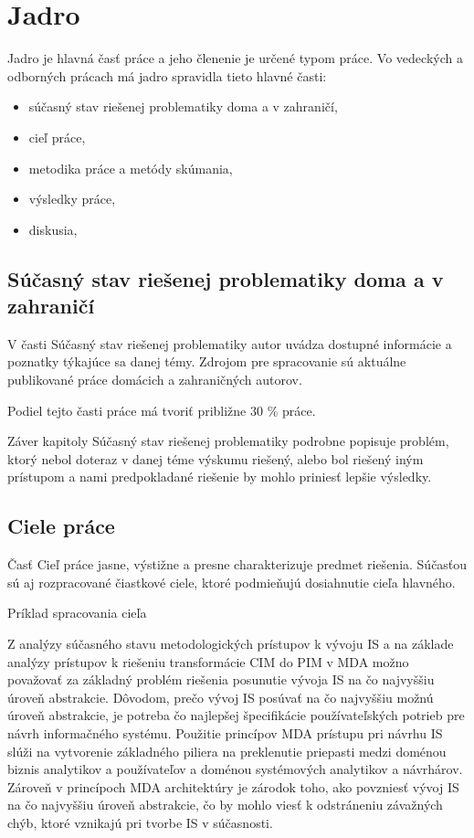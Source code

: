 \section{Jadro}

Jadro je hlavná časť práce a jeho členenie je určené typom práce. Vo vedeckých a odborných prácach má jadro spravidla tieto hlavné časti:

\begin{itemize}
	\item súčasný stav riešenej problematiky doma a v zahraničí,
	\item cieľ práce,
	\item metodika práce a metódy skúmania,
	\item výsledky práce,
	\item diskusia,
\end{itemize}

\subsection{Súčasný stav riešenej problematiky doma a v zahraničí}

V časti Súčasný stav riešenej problematiky autor uvádza dostupné informácie a poznatky týkajúce sa danej témy. Zdrojom pre spracovanie sú aktuálne publikované práce domácich a zahraničných autorov.

Podiel tejto časti práce má tvoriť približne 30 \% práce.

Záver kapitoly Súčasný stav riešenej problematiky podrobne popisuje problém, ktorý nebol doteraz v danej téme výskumu riešený, alebo bol riešený iným prístupom a nami predpokladané riešenie by mohlo priniesť lepšie výsledky.

\subsection{Ciele práce}

Časť Cieľ práce jasne, výstižne a presne charakterizuje predmet riešenia. Súčasťou sú aj rozpracované čiastkové ciele, ktoré podmieňujú dosiahnutie cieľa hlavného.

Príklad spracovania cieľa

Z analýzy súčasného stavu metodologických prístupov k vývoju IS a na základe analýzy prístupov k riešeniu transformácie CIM do PIM v MDA možno považovať za základný problém riešenia posunutie vývoja IS na čo najvyššiu úroveň abstrakcie. Dôvodom, prečo vývoj IS posúvať na čo najvyššiu možnú úroveň abstrakcie, je potreba čo najlepšej špecifikácie používateľských potrieb pre návrh informačného systému. Použitie princípov MDA prístupu pri návrhu IS slúži na vytvorenie základného piliera na preklenutie priepasti medzi doménou biznis analytikov a používateľov a doménou systémových analytikov a návrhárov. Zároveň v princípoch MDA architektúry je zárodok toho, ako povzniesť vývoj IS na čo najvyššiu úroveň abstrakcie, čo by mohlo viesť k odstráneniu závažných chýb, ktoré vznikajú pri tvorbe IS v súčasnosti.

